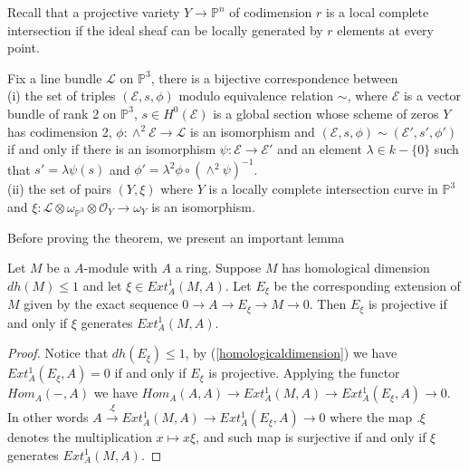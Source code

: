 \documentclass[
	oldfontcommands,
	sumario=abnt-6027-2012,
	12pt,			%
	openright,		%
	oneside,		%
	a4paper,		%
	english,		%
	brazil			%
	]{imecc-unicamp}
\begin{document}
Recall that a projective variety $Y \to \mathbb{P}^n$ of codimension $r$ is a local complete intersection if the ideal sheaf can be locally generated by $r$ elements at every point.
\begin{theorem}\cite[Hartshorne, Theorem 1.1]{Hartshorne1978}\label{hartshorneserre}
Fix a line bundle $\mathcal{L}$ on $\mathbb{P}^3$, there is a bijective correspondence between \\
(i) the set of triples $(\mathcal{E},s,\phi)$ modulo equivalence relation $\sim$, where $\mathcal{E}$ is a vector bundle of rank 2 on $\mathbb{P}^3$, $s \in H^0(\mathcal{E})$ is a global section whose scheme of zeros $Y$ has codimension 2, $\phi : \wedge^2 \mathcal{E} \to \mathcal{L}$ is an isomorphism and $(\mathcal{E},s,\phi) \sim (\mathcal{E}', s', \phi ')$ if and only if there is an isomorphism $\psi:\mathcal{E}\to \mathcal{E}'$ and an element $\lambda \in k-\{0\}$ such that $s'=\lambda\psi(s)$ and $\phi'=\lambda^2 \phi \circ (\wedge^2 \psi)^{-1}$. \\
(ii) the set of pairs $(Y,\xi)$ where $Y$ is a locally complete intersection curve in $\mathbb{P}^3$ and $\xi : \mathcal{L} \otimes \omega_{\mathbb{P}^3} \otimes \mathcal{O}_Y \to \omega_Y$ is an isomorphism.
\end{theorem}
\iffalse
Before proving the theorem, we present an important lemma
\begin{lemma}\cite[Serre, p.2-08]{serre_2003}
Let $M$ be a $A$-module with $A$ a ring. Suppose $M$ has homological dimension $dh(M) \leq 1$ and let $\xi \in Ext^1_A(M,A)$. Let $E_\xi$ be the corresponding extension of $M$ given by the exact sequence $0 \to A \to E_\xi \to M \to 0$. Then $E_\xi$ is projective if and only if $\xi$ generates $Ext^1_A(M,A)$.
\end{lemma}
\begin{proof}
Notice that $dh(E_\xi) \leq 1$, by (\ref{homologicaldimension}) we have $Ext^1_A(E_\xi,A)=0$ if and only if $E_\xi$ is projective. Applying the functor $Hom_A(-,A)$ we have $Hom_A(A,A) \to Ext^1_A(M,A) \to Ext^1_A(E_\xi,A) \to 0$. In other words $A \overset{.\xi}{\to} Ext^1_A(M,A) \to Ext^1_A(E_\xi,A) \to 0$ where the map $.\xi$ denotes the multiplication $x \mapsto x\xi$, and such map is surjective if and only if $\xi$ generates $Ext^1_A(M,A)$.
\end{proof}
\end{document}
